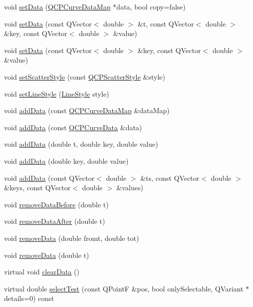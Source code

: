\begin{DoxyCompactItemize}
\item 
void \hyperlink{classQCPCurve_a631ac886708460013b30052f49cbc9da}{set\+Data} (\hyperlink{qcustomplot_8h_a444d37ec9cb2951b3a7fe443c34d1658}{Q\+C\+P\+Curve\+Data\+Map} $\ast$data, bool copy=false)
\item 
void \hyperlink{classQCPCurve_affe80e011e2ced62a88f614acd6ab8d1}{set\+Data} (const Q\+Vector$<$ double $>$ \&t, const Q\+Vector$<$ double $>$ \&key, const Q\+Vector$<$ double $>$ \&value)
\item 
void \hyperlink{classQCPCurve_a963d4c45777deef15848a8f56172d066}{set\+Data} (const Q\+Vector$<$ double $>$ \&key, const Q\+Vector$<$ double $>$ \&value)
\item 
void \hyperlink{classQCPCurve_a55e43b44709bf50a35500644988aa706}{set\+Scatter\+Style} (const \hyperlink{classQCPScatterStyle}{Q\+C\+P\+Scatter\+Style} \&style)
\item 
void \hyperlink{classQCPCurve_a4a377ec863ff81a1875c3094a6177c19}{set\+Line\+Style} (\hyperlink{classQCPCurve_a2710e9f79302152cff794c6e16cc01f1}{Line\+Style} style)
\item 
void \hyperlink{classQCPCurve_a4e24023c3b9ac75440c7a260172c99af}{add\+Data} (const \hyperlink{qcustomplot_8h_a444d37ec9cb2951b3a7fe443c34d1658}{Q\+C\+P\+Curve\+Data\+Map} \&data\+Map)
\item 
void \hyperlink{classQCPCurve_ad304326aba096911f92452d8bfe0470e}{add\+Data} (const \hyperlink{classQCPCurveData}{Q\+C\+P\+Curve\+Data} \&data)
\item 
void \hyperlink{classQCPCurve_a13398b236f6926014e404eeb5b9f415c}{add\+Data} (double t, double key, double value)
\item 
void \hyperlink{classQCPCurve_ada4762e793cd5707b33f35b8a4b0f8fb}{add\+Data} (double key, double value)
\item 
void \hyperlink{classQCPCurve_a27c8b3dddd4067d626397ee199626722}{add\+Data} (const Q\+Vector$<$ double $>$ \&ts, const Q\+Vector$<$ double $>$ \&keys, const Q\+Vector$<$ double $>$ \&values)
\item 
void \hyperlink{classQCPCurve_af6f4284fbc2f34e676f24dce03c34fe5}{remove\+Data\+Before} (double t)
\item 
void \hyperlink{classQCPCurve_a0365cb947c4e6d405ee22e00191d5f52}{remove\+Data\+After} (double t)
\item 
void \hyperlink{classQCPCurve_ad45bb5479be799163028ef2b776f7221}{remove\+Data} (double fromt, double tot)
\item 
void \hyperlink{classQCPCurve_a30c91acfa591ec534c49fed4c0fca39a}{remove\+Data} (double t)
\item 
virtual void \hyperlink{classQCPCurve_ae0462c61dbfbac07db0736ec64110241}{clear\+Data} ()
\item 
virtual double \hyperlink{classQCPCurve_a5af9949e725704811bbc81ecd5970b8e}{select\+Test} (const Q\+Point\+F \&pos, bool only\+Selectable, Q\+Variant $\ast$details=0) const 
\end{DoxyCompactItemize}

